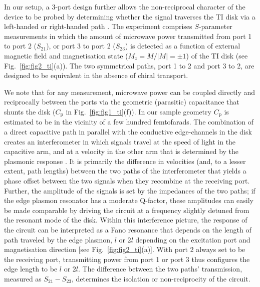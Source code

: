 In our setup, a 3-port design further allows the non-reciprocal character of the device to be probed by determining whether the signal traverses the TI disk via a left-handed or right-handed path \cite{PhysRevX.4.021019, mahoney2016chip}. The experiment comprises $S$-parameter measurements in which the amount of microwave power transmitted from port 1 to port 2 ($S_{21}$), or port 3 to port 2 ($S_{23}$) is detected as a function of external magnetic field and magnetisation state ($M_z = M/\left| M\right|= \pm 1$) of the TI disk (see Fig.~\ref{fig:fig2_ti}(a)). The two symmetrical paths, port 1 to 2 and port 3 to 2, are designed to be equivalent in the absence of chiral transport.

We note that for any measurement, microwave power can be coupled directly and reciprocally between the ports via the geometric (parasitic) capacitance that shunts the disk ($C_\textrm{p}$ in Fig.~\ref{fig:fig1_ti}(f)). In our sample geometry $C_\textrm{p}$ is estimated to be in the vicinity of a few hundred femtofarads. The combination of a direct capacitive path in parallel with the conductive edge-channels in the disk creates an interferometer in which signals travel at the speed of light in the capacitive arm, and at a velocity in the other arm that is determined by the plasmonic response \cite{mahoney2016chip}. It is primarily the difference in velocities (and, to a lesser extent, path lengths)
between the two paths of the interferometer that yields a phase offset between the two signals when they recombine at the receiving port. Further, the amplitude of the signals is set by the impedances of the two paths; if the edge plasmon resonator has a moderate Q-factor, these amplitudes can easily be made comparable by driving the circuit at a frequency slightly detuned from the resonant mode of the disk. Within this interference picture, the response of the circuit can be interpreted as a Fano resonance that depends on the length of path traveled by the edge plasmon, $l$ or 2$l$ depending on the excitation port and magnetisation direction [see Fig.~\ref{fig:fig2_ti}(a)]. With port 2 always set to be the receiving port, transmitting power from port 1 or port 3 thus configures the edge length to be $l$ or $2l$. The difference between the two paths' transmission, measured as $S_{21} - S_{23}$, determines the isolation or non-reciprocity of the circuit.

